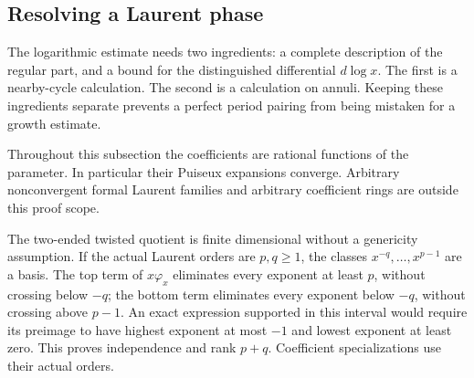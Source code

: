 \documentclass[11pt]{article}
\theoremstyle{definition}\newtheorem{definition}[theorem]{Definition}
\theoremstyle{remark}\newtheorem{remark}[theorem]{Remark}
\begin{document}
\subsection{Resolving a Laurent phase}\label{sec:laurentresolution}

The logarithmic estimate needs two ingredients: a complete description
of the regular part, and a bound for the distinguished differential
$d\log x$. The first is a nearby-cycle calculation. The second is a
calculation on annuli. Keeping these ingredients separate prevents a
perfect period pairing from being mistaken for a growth estimate.

Throughout this subsection the coefficients are rational functions of
the parameter. In particular their Puiseux expansions converge. Arbitrary nonconvergent formal Laurent families and arbitrary
coefficient rings are outside this proof scope.

The two-ended twisted quotient is finite dimensional without a
genericity assumption. If the actual Laurent orders are $p,q\geq1$,
the classes $x^{-q},\ldots,x^{p-1}$ are a basis. The top term of
$x\varphi_x$ eliminates every exponent at least $p$, without crossing
below $-q$; the bottom term eliminates every exponent below $-q$,
without crossing above $p-1$. An exact expression supported in this
interval would require its preimage to have highest exponent at most
$-1$ and lowest exponent at least zero. This proves independence
and rank $p+q$. Coefficient specializations use their actual orders.
\end{document}
